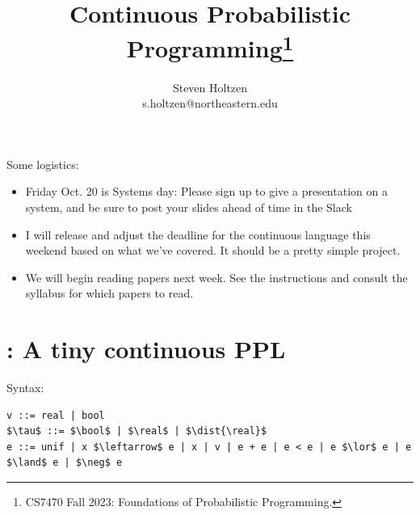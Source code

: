 \documentclass{tufte-handout}
\title{Continuous Probabilistic Programming\thanks{CS7470 Fall 2023: Foundations of Probabilistic Programming.}}
\author[]{Steven Holtzen\\s.holtzen@northeastern.edu}
\begin{document}
\maketitle%

Some logistics:
\begin{itemize}
  \item Friday Oct. 20 is Systems day: Please sign up to give a presentation on a 
  system, and be sure to post your slides ahead of time in the Slack
  \item I will release and adjust the deadline for the continuous language this
  weekend based on what we've covered. It should be a pretty simple project.
  \item We will begin reading papers next week. See the instructions and 
  consult the syllabus for which papers to read.
\end{itemize}

\section{\cont{}: A tiny continuous PPL}
Syntax: 
\begin{lstlisting}[mathescape = true]
v ::= real | bool
$\tau$ ::= $\bool$ | $\real$ | $\dist{\real}$
e ::= unif | x $\leftarrow$ e | x | v | e + e | e < e | e $\lor$ e | e $\land$ e | $\neg$ e
\end{lstlisting}
\end{document}
